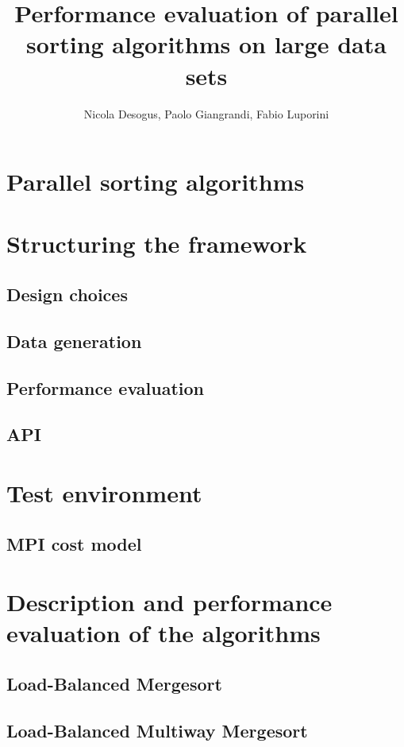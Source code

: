 \documentclass[a4paper,12pt,oneside,openright]{article}
\title{Performance evaluation of parallel sorting algorithms on large data sets}
\author{Nicola Desogus, Paolo Giangrandi, Fabio Luporini}
\begin{document}
\maketitle
\tableofcontents
\pagebreak



\section{Parallel sorting algorithms}

\section{Structuring the framework}
\subsection{Design choices}
\subsection{Data generation}
\subsection{Performance evaluation}
\subsection{API}

\section{Test environment}
\subsection{MPI cost model}

\pagebreak

\section{Description and performance evaluation of the algorithms}



\subsection{Load-Balanced Mergesort}
\subsection{Load-Balanced Multiway Mergesort}
\end{document}
